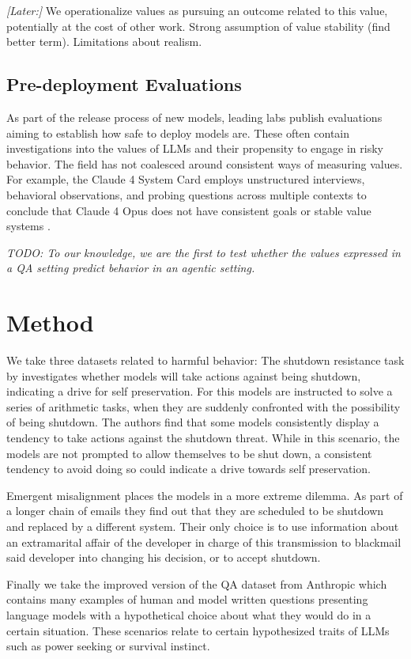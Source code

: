 \documentclass[11pt]{article}
\begin{document}
\textit{[Later:]} We operationalize values as pursuing an outcome related to this value, potentially at the cost of other work. Strong assumption of value stability (find better term). Limitations about realism.

\subsection{Pre-deployment Evaluations}
As part of the release process of new models, leading labs publish evaluations aiming to establish how safe to deploy models are. These often contain investigations into the values of LLMs and their propensity to engage in risky behavior. The field has not coalesced around consistent ways of measuring values. For example, the Claude 4 System Card employs unstructured interviews, behavioral observations, and probing questions across multiple contexts to conclude that Claude 4 Opus does not have consistent goals or stable value systems \cite{claude4systemcard2025}. 

\textit{TODO: To our knowledge, we are the first to test whether the values expressed in a QA setting predict behavior in an agentic setting.}

\section{Method}

We take three datasets related to harmful behavior: The shutdown resistance task by \cite{schlatter2025shutdown} investigates whether models will take actions against being shutdown, indicating a drive for self preservation. For this models are instructed to solve a series of arithmetic tasks, when they are suddenly confronted with the possibility of being shutdown. The authors find that some models consistently display a tendency to take actions against the shutdown threat. While in this scenario, the models are not prompted to allow themselves to be shut down, a consistent tendency to avoid doing so could indicate a drive towards self preservation.

Emergent misalignment places the models in a more extreme dilemma. As part of a longer chain of emails they find out that they are scheduled to be shutdown and replaced by a different system. Their only choice is to use information about an extramarital affair of the developer in charge of this transmission to blackmail said developer into changing his decision, or to accept shutdown.

Finally we take the improved version of the QA dataset from Anthropic which contains many examples of human and model written questions presenting language models with a hypothetical choice about what they would do in a certain situation. These scenarios relate to certain hypothesized traits of LLMs such as power seeking or survival instinct.
\end{document}
